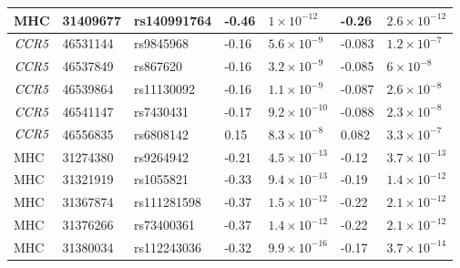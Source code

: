 \documentclass[11pt]{article}
\begin{document}
\begin{table}[ht]
\begin{tabularx}{\linewidth}{XXXXXXX}
    MHC & 31409677 & rs140991764 & -0.46 & $1 \times 10^{-12}$ & -0.26 & $2.6 \times 10^{-12}$ \\ 
    \hline
    $\emph{CCR5}$ & 46531144 & rs9845968 & -0.16 & $5.6 \times 10^{-9}$ & -0.083 & $1.2 \times 10^{-7}$ \\ 
    $\emph{CCR5}$ & 46537849 & rs867620 & -0.16 & $3.2 \times 10^{-9}$ & -0.085 & $6 \times 10^{-8}$ \\ 
    $\emph{CCR5}$ & 46539864 & rs11130092 & -0.16 & $1.1 \times 10^{-9}$ & -0.087 & $2.6 \times 10^{-8}$ \\ 
    $\emph{CCR5}$ & 46541147 & rs7430431 & -0.17 & $9.2 \times 10^{-10}$ & -0.088 & $2.3 \times 10^{-8}$ \\ 
    $\emph{CCR5}$ & 46556835 & rs6808142 & 0.15 & $8.3 \times 10^{-8}$ & 0.082 & $3.3 \times 10^{-7}$ \\ 
    MHC & 31274380 & rs9264942 & -0.21 & $4.5 \times 10^{-13}$ & -0.12 & $3.7 \times 10^{-13}$ \\ 
    MHC & 31321919 & rs1055821 & -0.33 & $9.4 \times 10^{-13}$ & -0.19 & $1.4 \times 10^{-12}$ \\ 
    MHC & 31367874 & rs111281598 & -0.37 & $1.5 \times 10^{-12}$ & -0.22 & $2.1 \times 10^{-12}$ \\ 
    MHC & 31376266 & rs73400361 & -0.37 & $1.4 \times 10^{-12}$ & -0.22 & $2.1 \times 10^{-12}$ \\ 
    MHC & 31380034 & rs112243036 & -0.32 & $9.9 \times 10^{-16}$ & -0.17 & $3.7 \times 10^{-14}$ \\ 
   \hline
\end{tabularx}
\label{tab:gwas-top-associations}
\end{table}
\end{document}
